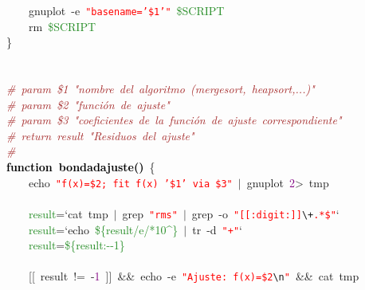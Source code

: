 \mbox{}\ \ \ \ gnuplot\ -e\ \texttt{\textcolor{Red}{"{}basename='\$1'"{}}}\ \textcolor{ForestGreen}{\$SCRIPT} \\
\mbox{}\ \ \ \ rm\ \textcolor{ForestGreen}{\$SCRIPT} \\
\mbox{}\} \\
\mbox{} \\
\mbox{} \\
\mbox{}\textit{\textcolor{Brown}{\#\ param\ \$1\ "{}nombre\ del\ algoritmo\ (mergesort,\ heapsort,...)"{}}} \\
\mbox{}\textit{\textcolor{Brown}{\#\ param\ \$2\ "{}función\ de\ ajuste"{}}} \\
\mbox{}\textit{\textcolor{Brown}{\#\ param\ \$3\ "{}coeficientes\ de\ la\ función\ de\ ajuste\ correspondiente"{}}} \\
\mbox{}\textit{\textcolor{Brown}{\#\ return\ result\ "{}Residuos\ del\ ajuste"{}}} \\
\mbox{}\textit{\textcolor{Brown}{\#}} \\
\mbox{}\textbf{\textcolor{Black}{function\ bondadajuste()}}\ \{ \\
\mbox{}\ \ \ \ echo\ \texttt{\textcolor{Red}{"{}f(x)=\$2;\ fit\ f(x)\ '\$1'\ via\ \$3"{}}}\ \textcolor{BrickRed}{$|$}\ gnuplot\ \textcolor{Purple}{2}\textcolor{BrickRed}{\textgreater{}}\ tmp \\
\mbox{}\ \ \ \  \\
\mbox{}\ \ \ \ \textcolor{ForestGreen}{result}\textcolor{BrickRed}{=}`cat\ tmp\ \textcolor{BrickRed}{$|$}\ grep\ \texttt{\textcolor{Red}{"{}rms"{}}}\ \textcolor{BrickRed}{$|$}\ grep\ -o\ \texttt{\textcolor{Red}{"{}[[:digit:]]}}\texttt{\textcolor{CarnationPink}{\textbackslash{}+}}\texttt{\textcolor{Red}{.*\$"{}}}` \\
\mbox{}\ \ \ \ \textcolor{ForestGreen}{result}\textcolor{BrickRed}{=}`echo\ \textcolor{ForestGreen}{\$\{result/e/*10\textasciicircum{}\}}\ \textcolor{BrickRed}{$|$}\ tr\ -d\ \texttt{\textcolor{Red}{"{}+"{}}}`\  \\
\mbox{}\ \ \ \ \textcolor{ForestGreen}{result}\textcolor{BrickRed}{=}\textcolor{ForestGreen}{\$\{result:-\/-1\}} \\
\mbox{}\ \ \ \  \\
\mbox{}\ \ \ \ \textcolor{BrickRed}{[[}\ result\ \textcolor{BrickRed}{!=}\ -\textcolor{Purple}{1}\ \textcolor{BrickRed}{]]}\ \textcolor{BrickRed}{\&\&}\ echo\ -e\ \texttt{\textcolor{Red}{"{}Ajuste:\ f(x)=\$2}}\texttt{\textcolor{CarnationPink}{\textbackslash{}n}}\texttt{\textcolor{Red}{"{}}}\ \textcolor{BrickRed}{\&\&}\ cat\ tmp \\
